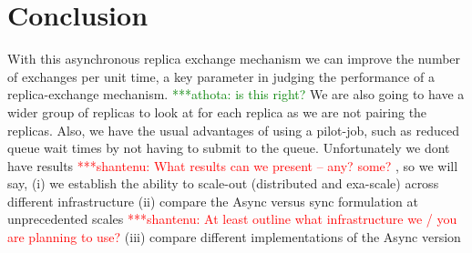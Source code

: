 \documentclass[a4paper,10pt]{article}
\newcommand{\jhanote}[1]{ {\textcolor{red} { ***shantenu: #1 }}}
\newcommand{\athotanote}[1]{ {\textcolor{green} { ***athota: #1 }}}
\newcommand{\jhanote}[1]{}
\newcommand{\athotanote}[1]{}
\begin{document}
\section{Conclusion}
With this asynchronous replica exchange mechanism we can improve the
number of exchanges per unit time, a key parameter in judging the
performance of a replica-exchange mechanism. \athotanote{is this
  right? }  We are also going to have a wider group of replicas to
look at for each replica as we are not pairing the replicas. Also, we
have the usual advantages of using a pilot-job, such as reduced queue
wait times by not having to submit to the queue.  Unfortunately we
dont have results \jhanote{What results can we present -- any? some?},
so we will say, (i) we establish the ability to scale-out (distributed
and exa-scale) across different infrastructure (ii) compare the Async
versus sync formulation at unprecedented scales \jhanote{At least
  outline what infrastructure we / you are planning to use?} (iii)
compare different implementations of the Async version
 
  
 
\end{document}

